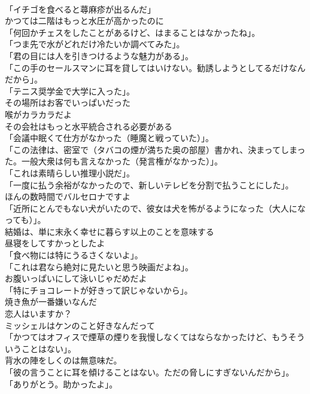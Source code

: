 \documentclass[8pt]{extreport}
\begin{document}
\begin{CJK}{UTF8}{min}
\\	「イチゴを食べると蕁麻疹が出るんだ」	
\\	かつては二階はもっと水圧が高かったのに	
\\	「何回かチェスをしたことがあるけど、はまることはなかったね」。	
\\	「つま先で水がどれだけ冷たいか調べてみた」。	
\\	「君の目には人を引きつけるような魅力がある」。	
\\	「この手のセールスマンに耳を貸してはいけない。勧誘しようとしてるだけなんだから」。	
\\	「テニス奨学金で大学に入った」。	
\\	その場所はお客でいっぱいだった	
\\	喉がカラカラだよ	
\\	その会社はもっと水平統合される必要がある	
\\	「会議中眠くて仕方がなかった（睡魔と戦っていた）」。	
\\	「この法律は、密室で（タバコの煙が満ちた奥の部屋）書かれ、決まってしまった。一般大衆は何も言えなかった（発言権がなかった）」。	
\\	「これは素晴らしい推理小説だ」。	
\\	「一度に払う余裕がなかったので、新しいテレビを分割で払うことにした」。	
\\	ほんの数時間でバルセロナですよ	
\\	「近所にとんでもない犬がいたので、彼女は犬を怖がるようになった（大人になっても）」。	
\\	結婚は、単に末永く幸せに暮らす以上のことを意味する	
\\	昼寝をしてすかっとしたよ	
\\	「食べ物には特にうるさくないよ」。	
\\	「これは君なら絶対に見たいと思う映画だよね」。	
\\	お腹いっぱいにして泳いじゃだめだよ	
\\	「特にチョコレートが好きって訳じゃないから」。	
\\	焼き魚が一番嫌いなんだ	
\\	恋人はいますか？	
\\	ミッシェルはケンのこと好きなんだって	
\\	「かつてはオフィスで煙草の煙りを我慢しなくてはならなかったけど、もうそういうことはない」。	
\\	背水の陣をしくのは無意味だ。	
\\	「彼の言うことに耳を傾けることはない。ただの脅しにすぎないんだから」。	
\\	「ありがとう。助かったよ」。	

\end{CJK}
\end{document}

